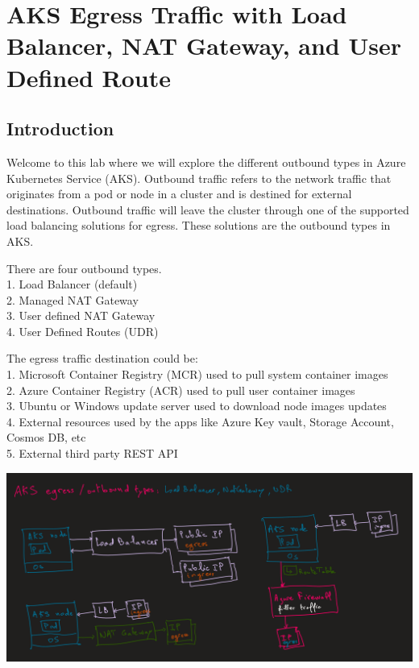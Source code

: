 \documentclass[
]{article}
\author{}
\date{}
\begin{document}
{
\setcounter{tocdepth}{3}
\tableofcontents
}
\hypertarget{aks-egress-traffic-with-load-balancer-nat-gateway-and-user-defined-route}{%
\section{AKS Egress Traffic with Load Balancer, NAT Gateway, and User
Defined
Route}\label{aks-egress-traffic-with-load-balancer-nat-gateway-and-user-defined-route}}

\hypertarget{introduction}{%
\subsection{Introduction}\label{introduction}}

Welcome to this lab where we will explore the different outbound types
in Azure Kubernetes Service (AKS). Outbound traffic refers to the
network traffic that originates from a pod or node in a cluster and is
destined for external destinations. Outbound traffic will leave the
cluster through one of the supported load balancing solutions for
egress. These solutions are the outbound types in AKS.

There are four outbound types.\\
1. Load Balancer (default)\\
2. Managed NAT Gateway\\
3. User defined NAT Gateway\\
4. User Defined Routes (UDR)

The egress traffic destination could be:\\
1. Microsoft Container Registry (MCR) used to pull system container
images\\
2. Azure Container Registry (ACR) used to pull user container images\\
3. Ubuntu or Windows update server used to download node images
updates\\
4. External resources used by the apps like Azure Key vault, Storage
Account, Cosmos DB, etc\\
5. External third party REST API

\includegraphics{images/65_aks_egress_lb_natgw_udr__architecture.png}
\end{document}
